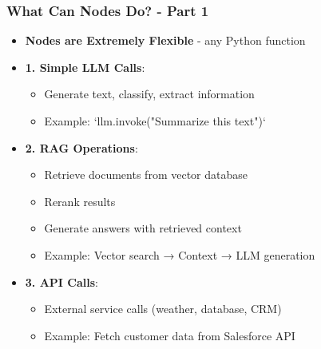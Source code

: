 \begin{frame}[fragile]\frametitle{What Can Nodes Do? - Part 1}
      \begin{itemize}
        \item \textbf{Nodes are Extremely Flexible} - any Python function
        \item \textbf{1. Simple LLM Calls}:
        \begin{itemize}
            \item Generate text, classify, extract information
            \item Example: `llm.invoke("Summarize this text")`
        \end{itemize}
        \item \textbf{2. RAG Operations}:
        \begin{itemize}
            \item Retrieve documents from vector database
            \item Rerank results
            \item Generate answers with retrieved context
            \item Example: Vector search → Context → LLM generation
        \end{itemize}
        \item \textbf{3. API Calls}:
        \begin{itemize}
            \item External service calls (weather, database, CRM)
            \item Example: Fetch customer data from Salesforce API
        \end{itemize}
      \end{itemize}
\end{frame}

